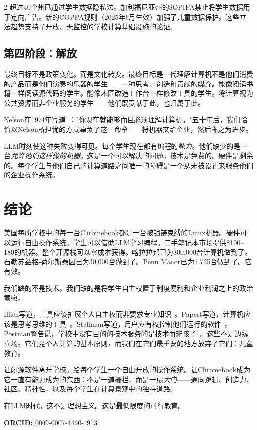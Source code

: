 \documentclass[11pt, a4paper]{article}
\begin{document}
\begin{multicols}{2}
超过40个州已通过学生数据隐私法。加利福尼亚州的SOPIPA禁止将学生数据用于定向广告。新的COPPA规则（2025年6月生效）加强了儿童数据保护。这些立法趋势支持了开放、无监控的学校计算基础设施的论证。

\subsection{第四阶段：解放}

最终目标不是政策变化。而是文化转变。最终目标是一代理解计算机不是他们消费的产品而是他们演奏的乐器的学生——一种思考、创造和贡献的媒介。能像阅读书籍一样阅读源代码的学生。能像木匠改造工作台一样修改工具的学生。将计算视为公共资源而非企业服务的学生——他们既贡献于此，也归属于此。

Nelson在1974年写道~\citep{nelson1974computerlib}："你现在就能够而且必须理解计算机。"五十年后，我们恰恰以Nelson所担忧的方式辜负了这一命令——将机器交给企业，然后称之为进步。

LLM时刻使这种失败变得可见。每个学生现在都有编程的\emph{能力}。他们缺少的是一台\emph{允许他们这样做的机器}。这是一个可以解决的问题。技术是免费的。硬件是剩余的。每个学生与他们自己的计算道路之间唯一的障碍是一个从未被设计来服务他们的企业操作系统。


\section{结论}

美国每所学校中的每一台Chromebook都是一台被锁链束缚的Linux机器。硬件可以运行自由操作系统。学生可以借助LLM学习编程。二手笔记本市场提供\$100--180的机器。整个开源栈可以零成本获得。喀拉拉邦已为300,000台计算机做到了。石勒苏益格-荷尔斯泰因已为30,000台做到了。Penn Manor已为1,725台做到了。它有效。

我们缺的不是技术。我们缺的是将学生自主权置于制度便利和企业利润之上的政治意愿。

Illich写道，工具应该扩展个人自主权而非要求专业知识~\citep{illich1973tools}。Papert写道，计算机应该是思考思维的工具~\citep{papert1980mindstorms}。Stallman写道，用户应有权控制他们运行的软件~\citep{stallman2002free}。Postman警告说，学校中没有目的的技术服务的是技术而非孩子~\citep{postman1995end}。这些不是边缘立场。它们是个人计算的基本原则，而我们在它们最重要的地方放弃了它们：儿童教育。

让闭源软件离开学校。给每个学生一个自由开放的操作系统。让Chromebook成为它一直有能力成为的东西：不是一道栅栏，而是一扇\emph{大门}——通向逻辑、创造力、社区、精神性，以及每个学生在计算景观中的独特道路。

在LLM时代，这不是理想主义。这是最低限度的可行教育。

\vspace{0.5em}
\noindent\textbf{ORCID:} \href{https://orcid.org/0009-0007-4460-4913}{0009-0007-4460-4913}

\end{multicols}




\end{document}
